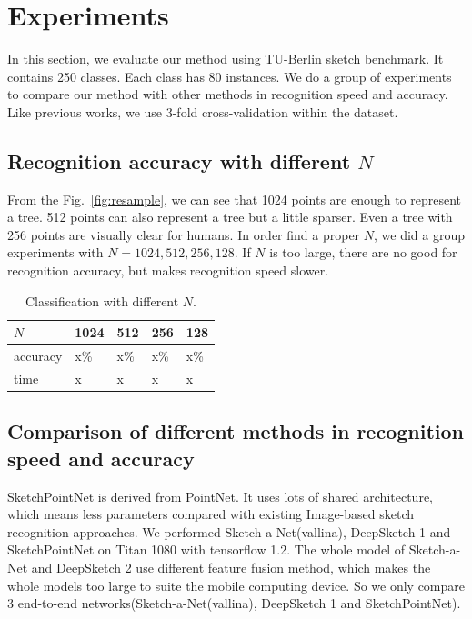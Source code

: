 \section{Experiments}
\label{sec:experiments}
In this section, we evaluate our method using  TU-Berlin sketch benchmark. It contains 250 classes. Each class has 80 instances. We do a group of experiments to compare our method with other methods in recognition speed and accuracy. Like previous works, we use 3-fold cross-validation within the dataset.


\subsection{Recognition accuracy with different $N$}
\label{ssec:resample_number}

From the Fig.~\ref{fig:resample}, we can see that 1024 points are enough to represent a tree. 512 points can also represent a tree but a little sparser. Even a tree with 256 points are visually clear for humans. In order find a proper $N$, we did a group experiments with $N = 1024, 512, 256, 128$. If $N$ is too large, there are no good for recognition accuracy, but makes recognition speed slower.

\begin{table}[htbp]
\begin{tabular}{|p{1.4cm}|p{1.3cm}|p{1.3cm}|p{1.3cm}|p{1.3cm}|}
    \hline
     $N$ & 1024& 512 & 256 & 128\\
    \hline
     accuracy & x\% & x\% & x\%& x\%\\
    \hline
     time & x & x & x& x\\
    \hline
\end{tabular}
\caption{Classification with different $N$.}
\end{table}

\subsection{Comparison of different methods in recognition speed and accuracy}
\label{ssec:cm_speed}
SketchPointNet is derived from PointNet. It uses lots of shared architecture, which means less parameters compared with existing Image-based sketch recognition approaches. We performed Sketch-a-Net(vallina), DeepSketch 1 and SketchPointNet on Titan 1080 with tensorflow 1.2. The whole model of Sketch-a-Net and DeepSketch 2 \cite{Dupont2016DeepSketch2D} use different feature fusion method, which makes the whole models too large to suite the mobile computing device. So we only compare 3 end-to-end networks(Sketch-a-Net(vallina), DeepSketch 1 and SketchPointNet).

